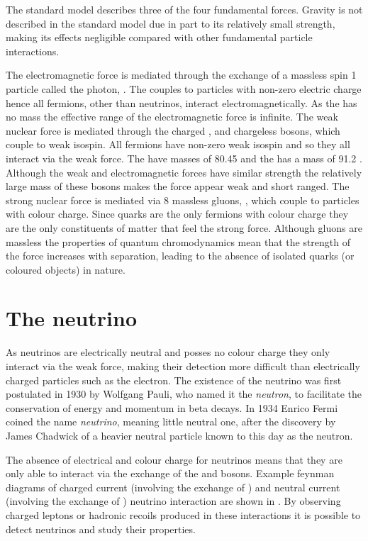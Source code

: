 The standard model describes three of the four fundamental forces. Gravity is not described in the standard model due in part to its relatively small strength, making its effects negligible compared with other fundamental particle interactions.

The electromagnetic force is mediated through the exchange of a massless spin 1 particle called the photon, \Pphoton. The \Pphoton couples to particles with non-zero electric charge hence all fermions, other than neutrinos, interact electromagnetically. As the \Pphoton has no mass the effective range of the electromagnetic force is infinite. The weak nuclear force is mediated through the charged \PWplus, \PWminus and chargeless \PZzero bosons, which couple to weak isospin. All fermions have non-zero weak isospin and so they all interact via the weak force. The \PWpm have masses of 80.45 \GeV and the \PZzero has a mass of 91.2 \GeV. Although the weak and electromagnetic forces have similar strength the relatively large mass of these bosons makes the force appear weak and short ranged. The strong nuclear force is mediated via 8 massless gluons, \Pgluon, which couple to particles with colour charge. Since quarks are the only fermions with colour charge they are the only constituents of matter that feel the strong force. Although gluons are massless the properties of quantum chromodynamics mean that the strength of the force increases with separation, leading to the absence of isolated quarks (or coloured objects) in nature.



\section{The neutrino}
\label{section:particle-physics:neutrino}

As neutrinos are electrically neutral and posses no colour charge they only interact via the weak force, making their detection more difficult than electrically charged particles such as the electron. The existence of the neutrino was first postulated in 1930 by Wolfgang Pauli, who named it the \textit{neutron}, to facilitate the conservation of energy and momentum in beta decays. In 1934 Enrico Fermi coined the name \textit{neutrino}, meaning little neutral one, after the discovery by James Chadwick of a heavier neutral particle known to this day as the neutron.

The absence of electrical and colour charge for neutrinos means that they are only able to interact via the exchange of the \PWpm and \PZzero bosons. Example feynman diagrams of charged current (involving the exchange of \PWpm) and neutral current (involving the exchange of \PZzero) neutrino interaction are shown in . By observing charged leptons or hadronic recoils produced in these interactions it is possible to detect neutrinos and study their properties.

